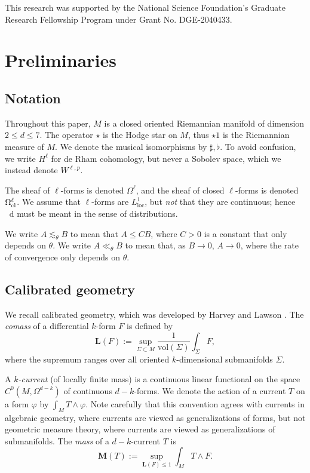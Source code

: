 \documentclass[reqno,11pt]{amsart}
\newcommand*\dif{\mathop{}\!\mathrm{d}}
\newcommand{\vol}{\mathrm{vol}}
\newcommand{\Mass}{\mathbf M}
\newcommand{\Comass}{\mathbf L}
\newcommand{\dfn}[1]{\emph{#1}\index{#1}}
\newcommand{\loc}{\mathrm{loc}}
\theoremstyle{definition}
\numberwithin{equation}{section}
\begin{document}
This research was supported by the National Science Foundation's Graduate Research Fellowship Program under Grant No. DGE-2040433.

\section{Preliminaries}\label{prevResults}
\subsection{Notation}
Throughout this paper, $M$ is a closed oriented Riemannian manifold of dimension $2 \leq d \leq 7$.
The operator $\star$ is the Hodge star on $M$, thus $\star 1$ is the Riemannian measure of $M$.
We denote the musical isomorphisms by $\sharp, \flat$.
To avoid confusion, we write $H^\ell$ for de Rham cohomology, but never a Sobolev space, which we instead denote $W^{\ell, p}$.

The sheaf of $\ell$-forms is denoted $\Omega^\ell$, and the sheaf of closed $\ell$-forms is denoted $\Omega^\ell_{\rm cl}$.
We assume that $\ell$-forms are $L^1_\loc$, but \emph{not} that they are continuous; hence $\dif$ must be meant in the sense of distributions.

We write $A \lesssim_\theta B$ to mean that $A \leq CB$, where $C > 0$ is a constant that only depends on $\theta$.
We write $A \ll_\theta B$ to mean that, as $B \to 0$, $A \to 0$, where the rate of convergence only depends on $\theta$.

\subsection{Calibrated geometry}
We recall calibrated geometry, which was developed by Harvey and Lawson \cite{Harvey82}.
The \dfn{comass} of a differential $k$-form $F$ is defined by 
$$\Comass(F) := \sup_{\Sigma \subset M} \frac{1}{\vol(\Sigma)} \int_\Sigma F,$$
where the supremum ranges over all oriented $k$-dimensional submanifolds $\Sigma$.

A \dfn{$k$-current} (of locally finite mass) is a continuous linear functional on the space $C^0(M, \Omega^{d - k})$ of continuous $d - k$-forms.
We denote the action of a current $T$ on a form $\varphi$ by $\int_M T \wedge \varphi$.
Note carefully that this convention agrees with currents in algebraic geometry, where currents are viewed as generalizations of forms, but not geometric measure theory, where currents are viewed as generalizations of submanifolds.
The \dfn{mass} of a $d - k$-current $T$ is
$$\Mass(T) := \sup_{\Comass(F) \leq 1} \int_M T \wedge F.$$
\end{document}
